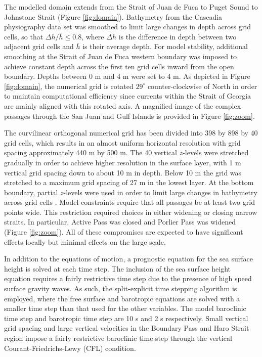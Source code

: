 \documentclass[letterpaper]{tATO2e}
\begin{document}
The modelled domain extends from the Strait of Juan de Fuca to Puget Sound to Johnstone Strait (Figure \ref{fig:domain}). Bathymetry from the Cascadia physiography data set \citep{haugerud1999digital} was smoothed to limit large changes in depth across grid cells, so that $\Delta h/\bar{h} \leq 0.8$, where $\Delta h$ is the difference in depth between two adjacent grid cells and $\bar{h}$ is their average depth. For model stability, additional smoothing at the Strait of Juan de Fuca western boundary was imposed to achieve constant depth across the first ten grid cells {\color{red} inward from the open boundary. Depths between 0 m and 4 m were set to 4 m.}  As depicted in Figure \ref{fig:domain}, the numerical grid is rotated $29^{\circ}$ counter-clockwise of North in order to maintain computational efficiency since currents within the Strait of Georgia are mainly aligned with this rotated axis. {\color{red} A magnified image of the complex passages through the San Juan and Gulf Islands is provided in Figure \ref{fig:zoom}.}

The curvilinear orthogonal numerical grid has been divided into 398 by 898 by 40 grid cells, which results in an almost uniform horizontal resolution with grid spacing approximately 440 m by 500 m. The 40 vertical $z$-levels were stretched gradually in order to achieve higher resolution in the surface layer, with 1 m vertical grid spacing down to about 10 m in depth. Below 10 m the grid was stretched to a maximum grid spacing of 27 m in the lowest layer. At the bottom boundary, partial $z$-levels were used in order to limit large changes in bathymetry across grid cells \citep{madec2012nemo}. {\color{red} Model constraints require that all passages be at least two grid points wide.  This restriction required choices in either widening or closing narrow straits.  In particular, Active Pass was closed and Porlier Pass was widened (Figure \ref{fig:zoom}). All of these compromises are expected to have significant effects locally but minimal effects on the large scale.}

In addition to the equations of motion, a prognostic equation for the sea surface height is solved at each time step. The inclusion of the sea surface height equation requires a fairly restrictive time step due to the presence of high speed surface gravity waves. As such, the split-explicit time stepping algorithm is employed, where the free surface and barotropic equations are solved with a smaller time step than that used for the other variables. The model baroclinic time step and barotropic time step are 10 s and 2 s respectively. Small vertical grid spacing and large vertical velocities in the Boundary Pass and Haro Strait region impose a fairly restrictive baroclinic time step through the vertical Courant-Friedrichs-Lewy (CFL) condition.
\end{document}
